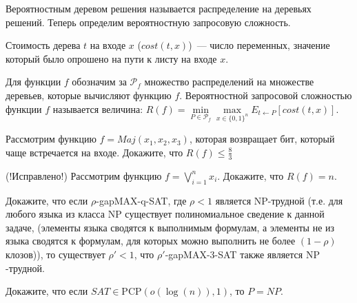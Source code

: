 Вероятностным деревом решения называется распределение на деревьях решений. Теперь
определим вероятностную запросовую сложность.

Стоимость дерева $t$ на входе $x$ (${cost}(t, x)$)~--- число переменных, значение
который было опрошено на пути к листу на входе $x$.

Для функции $f$ обозначим за $\mathcal{P}_f$ множество распределений на множестве
деревьев, которые вычисляют функцию $f$. Вероятностной запросовой сложностью функции
$f$ называется величина:
$R(f) = \min\limits_{P \in \mathcal{P}_f} \max\limits_{x \in \{0, 1\}^n}
E_{t \gets P}[{cost}(t, x)]$.


\begin{task}
    Рассмотрим функцию $f = Maj(x_1, x_2, x_3)$, которая возвращает бит, который чаще
    встречается на входе. Докажите, что $R(f) \le \frac{8}{3}$
\end{task}

\begin{task}(!Исправлено!)
    Рассмотрим функцию $f = \bigvee\limits_{i = 1}^{n} x_i$. Докажите, что $R(f) = n$.
\end{task}




\breakline

\begin{ptask}{36}
    Докажите, что если $\rho${-gap}{MAX-q-SAT}, где $\rho < 1$ является
    $\mathrm{NP}$-трудной (т.е. для любого языка из класса $\mathrm{NP}$ существует
    полиномиальное сведение к данной задаче, (элементы языка сводятся к выполнимым
    формулам, а элементы не из языка сводятся к формулам, для которых можно выполнить
    не более $(1 - \rho)$ клозов)), то существует $\rho' < 1$, что
    $\rho'${-gap}{MAX-3-SAT}  также является $\mathrm{NP}$-трудной.
\end{ptask}


\begin{ptask}{39}
    Докажите, что если $SAT \in \mathrm{PCP}(o(\log(n)), 1)$, то $P = NP$.
\end{ptask}
